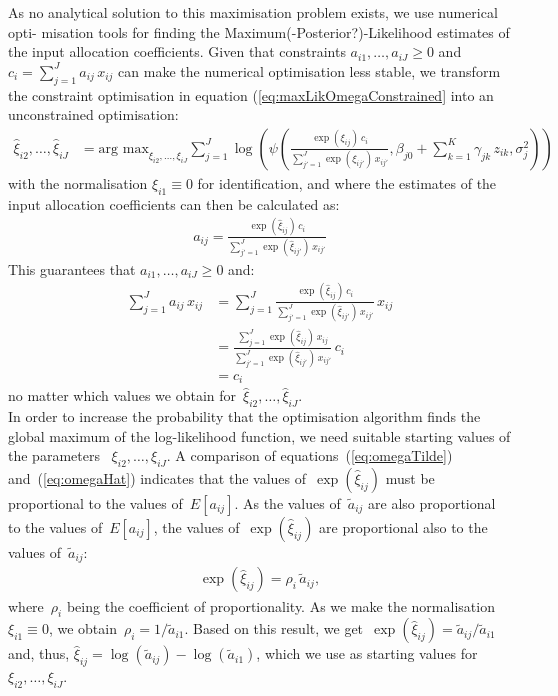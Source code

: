 \documentclass[12pt]{article}
\begin{document}
As no analytical solution to this maximisation problem exists, we use numerical opti-
misation tools for finding the Maximum(-Posterior?)-Likelihood estimates of the input allocation coefficients. Given that constraints $a_{i1},\ldots , a_{iJ} ≥ 0$ and $c_i = \sum_{j=1}^J a_{ij} \, x_{ij}$ can make the numerical optimisation less stable, we transform the constraint optimisation in equation (\ref{eq:maxLikOmegaConstrained} into an unconstrained optimisation:
\begin{align}
    \hat{\xi}_{i2}, \ldots, \hat{\xi}_{iJ}
    & = \text{arg max}_{\xi_{i2}, \ldots, \xi_{iJ} }
    \sum_{j=1}^J \log \left( \psi \left( 
        \frac{\exp( \xi_{ij} ) \, c_i }{
    \sum_{j'=1}^J \exp( \xi_{ij'} ) \, x_{ij'} }, 
        \beta_{j0}+\sum_{k=1}^K \gamma_{jk} \, z_{ik},
    \sigma_{j}^2 \right) \right)
    \label{eq:maxLikOmegaUnconstrained}
\end{align}
with the normalisation $\xi_{i1} \equiv 0$ for identification, and where the estimates of the input
allocation coefficients can then be calculated as:
\begin{align}
    a_{ij} = \frac{\exp( \hat{\xi}_{ij} ) \, c_i }{
    \sum_{j'=1}^J \exp( \hat{\xi}_{ij'} ) \, x_{ij'} }
    \label{eq:omegaHat}
\end{align}
This guarantees that $a_{i1}, \ldots, a_{iJ} \geq 0$ and:
\begin{align}
    \sum_{j=1}^J a_{ij} \, x_{ij}
    & = \sum_{j=1}^J \frac{\exp( \hat{\xi}_{ij} )  \, c_i}{
    \sum_{j'=1}^J \exp( \hat{\xi}_{ij'} ) \, x_{ij'} } 
    \, x_{ij}\\
    & = \frac{ \sum_{j=1}^J \exp( \hat{\xi}_{ij}) \, x_{ij} }{
    \sum_{j'=1}^J \exp( \hat{\xi}_{ij'} ) \, x_{ij'} } 
    \, c_i\\
& = c_i
\end{align}
no matter which values we obtain for~$\hat{\xi}_{i2}, \ldots, \hat{\xi}_{iJ}$.
\\[0.25cm]
In order to increase the probability 
that the optimisation algorithm finds the global maximum of the log-likelihood function, we need suitable starting values of the parameters%
~$\xi_{i2}, \ldots, \xi_{iJ}$.
A comparison of equations~(\ref{eq:omegaTilde}) and~(\ref{eq:omegaHat}) indicates that the values of~$\exp( \hat{\xi}_{ij} )$ must be proportional to the values of~$E[ a_{ij} ]$.
As the values of~$\tilde{a}_{ij}$ are also proportional to the values of~$E[ a_{ij} ]$, the values of~$\exp( \hat{\xi}_{ij} )$ are proportional also to the values of~$\tilde{a}_{ij}$:
\begin{align}
    \exp( \hat{\xi}_{ij} ) = \rho_i \, \tilde{a}_{ij},
\end{align}
where~$\rho_i$ being the coefficient of proportionality.
As we make the normalisation~$\xi_{i1} \equiv 0$, we obtain~$\rho_i = 1 / \tilde{a}_{i1}$.
Based on this result, we get~$\exp( \hat{\xi}_{ij} ) = \tilde{a}_{ij} / \tilde{a}_{i1}$
and, thus, $\hat{\xi}_{ij} = \log( \tilde{a}_{ij} ) 
- \log ( \tilde{a}_{i1} )$, which we use as starting values for~$\xi_{i2}, \ldots, \xi_{iJ}$.
\end{document}
